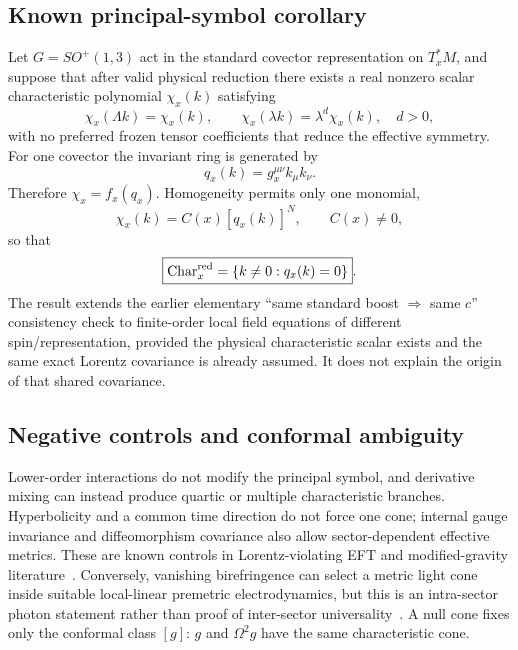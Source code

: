 \documentclass[11pt,a4paper]{article}
\begin{document}
\subsection{Known principal-symbol corollary}
Let $G=SO^+(1,3)$ act in the standard covector representation on $T_x^*M$, and suppose that after valid physical reduction there exists a real nonzero scalar characteristic polynomial $\chi_x(k)$ satisfying
\begin{equation}
\chi_x(\Lambda k)=\chi_x(k),\qquad \chi_x(\lambda k)=\lambda^d\chi_x(k),\quad d>0,
\end{equation}
with no preferred frozen tensor coefficients that reduce the effective symmetry. For one covector the invariant ring is generated by
\begin{equation}
q_x(k)=g_x^{\mu\nu}k_\mu k_\nu.
\end{equation}
Therefore $\chi_x=f_x(q_x)$. Homogeneity permits only one monomial,
\begin{equation}
\boxed{\chi_x(k)=C(x)[q_x(k)]^N},\qquad C(x)\neq0,
\end{equation}
so that
\begin{equation}
\boxed{\operatorname{Char}^{\rm red}_x=\{k\neq0:q_x(k)=0\}}.
\end{equation}
The result extends the earlier elementary ``same standard boost $\Rightarrow$ same $c$'' consistency check to finite-order local field equations of different spin/representation, provided the physical characteristic scalar exists and the same exact Lorentz covariance is already assumed. It does not explain the origin of that shared covariance.

\subsection{Negative controls and conformal ambiguity}
Lower-order interactions do not modify the principal symbol, and derivative mixing can instead produce quartic or multiple characteristic branches. Hyperbolicity and a common time direction do not force one cone; internal gauge invariance and diffeomorphism covariance also allow sector-dependent effective metrics. These are known controls in Lorentz-violating EFT and modified-gravity literature~\cite{coleman1999,reall2014,reall2021}. Conversely, vanishing birefringence can select a metric light cone inside suitable local-linear premetric electrodynamics, but this is an intra-sector photon statement rather than proof of inter-sector universality~\cite{lammerzahl2004}. A null cone fixes only the conformal class $[g]$: $g$ and $\Omega^2g$ have the same characteristic cone.
\end{document}
